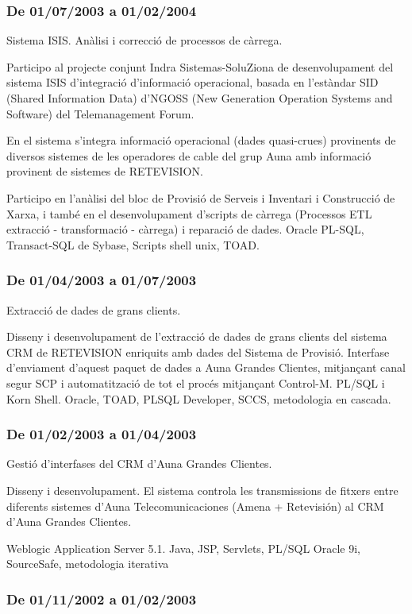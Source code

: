 \documentclass[11pt]{article}
\begin{document}
\subsubsection{De 01/07/2003 a 01/02/2004}
\label{sec-5-1-8}

Sistema ISIS. Anàlisi i correcció de processos de càrrega.

Participo al projecte conjunt Indra Sistemas-SoluZiona de desenvolupament del sistema ISIS d’integració d’informació operacional, basada en l’estàndar SID (Shared Information Data) d’NGOSS (New Generation Operation Systems and Software) del Telemanagement Forum. 

En el sistema s’integra informació operacional (dades quasi-crues) provinents de diversos sistemes de les operadores de cable del grup Auna amb informació provinent de sistemes de RETEVISION. 

Participo en l’anàlisi del bloc de Provisió de Serveis i Inventari i Construcció de Xarxa, i també en el desenvolupament d’scripts de càrrega (Processos ETL extracció - transformació - càrrega) i reparació de dades. Oracle PL-SQL, Transact-SQL de Sybase, Scripts shell unix, TOAD.
\subsubsection{De 01/04/2003 a 01/07/2003}
\label{sec-5-1-9}

Extracció de dades de grans clients.

Disseny i desenvolupament de l’extracció de dades de grans clients del sistema CRM de RETEVISION enriquits amb dades del Sistema de Provisió. Interfase d’enviament d’aquest paquet de dades a Auna Grandes Clientes, mitjançant canal segur SCP i automatització de tot el procés mitjançant Control-M. PL/SQL i Korn Shell. Oracle, TOAD, PLSQL Developer, SCCS, metodologia en cascada.
\subsubsection{De 01/02/2003 a 01/04/2003}
\label{sec-5-1-10}

Gestió d’interfases del CRM d’Auna Grandes Clientes.

Disseny i desenvolupament. El sistema controla les transmissions de fitxers entre diferents sistemes d’Auna Telecomunicaciones (Amena + Retevisión) al CRM d’Auna Grandes Clientes. 

Weblogic Application Server 5.1. Java, JSP, Servlets, PL/SQL Oracle 9i, SourceSafe, metodologia iterativa
\subsubsection{De 01/11/2002 a 01/02/2003}
\label{sec-5-1-11}
\end{document}
